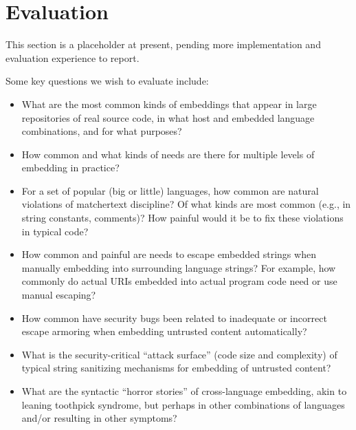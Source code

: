 \section{Evaluation}
\label{sec:eval}

This section is a placeholder at present,
pending more implementation and evaluation experience to report.

Some key questions we wish to evaluate include:
\begin{itemize}
\item	What are the most common kinds of embeddings
	that appear in large repositories of real source code,
	in what host and embedded language combinations,
	and for what purposes?
\item	How common and what kinds of needs are there for
	multiple levels of embedding in practice?
\item	For a set of popular (big or little) languages,
	how common are natural violations of matchertext discipline?
	Of what kinds are most common (e.g., in string constants, comments)?
	How painful would it be to fix these violations in typical code?
\item	How common and painful are needs to escape embedded strings
	when manually embedding into surrounding language strings?
	For example, how commonly do actual URIs embedded into
	actual program code need or use manual escaping?
\item	How common have security bugs been related to
	inadequate or incorrect escape armoring
	when embedding untrusted content automatically?
\item	What is the security-critical ``attack surface''
	(\eg code size and complexity)
	of typical string sanitizing mechanisms
	for embedding of untrusted content?
\item	What are the syntactic ``horror stories'' of cross-language embedding,
	akin to leaning toothpick syndrome,
	but perhaps in other combinations of languages
	and/or resulting in other symptoms?
\end{itemize}


